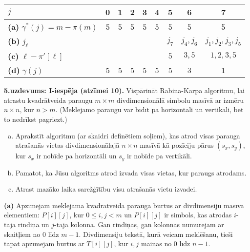 \documentclass[11pt]{article}
\begin{document}
\begin{tabular}{|l||c|c|c|c|c|c|c|c|} \hline
$j$ & 0 & 1 & 2 & 3 & 4 & 5 & 6 & 7 \\ \hline\hline
{\bf (a)} $\gamma^{\ast}(j) = m-\pi(m)$ & 5 & 5 & 5 & 5 & 5 & 5 & 5 & 5 \\ \hline
{\bf (b)} $j_\ell$ & & & & & & $j_7$ & $j_4,j_6$ & $j_1,j_2,j_3,j_5$ \\ \hline
{\bf (c)} $\ell - \pi'[\ell]$ &  &  &  & & & $5$ & $3,5$ & $1,2,3,5$ \\ \hline
{\bf (d)} $\gamma(j)$ & 5 & 5 & 5 & 5 & 5 & 5 & 3 & 1 \\ \hline
\end{tabular}




{\footnotesize
\vspace{10ex}
{\bf 5.uzdevums: I-iespēja (atzīmei 10).}
Vispārināt Rabina-Karpa algoritmu, lai atrastu kvadrātveida paraugu $m \times m$
divdimensionālā simbolu masīvā ar izmēru $n \times n$, kur $n > m$.
(Meklējamo paraugu var bīdīt pa horizontāli un vertikāli, bet to nedrīkst pagriezt.)
\begin{enumerate}[(a)]
\item
Aprakstīt algoritmu (ar skaidri definētiem soļiem),
kas atrod visas parauga atrašanās vietas divdimensionālajā
$n \times n$ masīvā kā pozīciju pārus $(s_x,s_y)$, kur $s_x$ ir nobīde pa horizontāli
un $s_y$ ir nobīde pa vertikāli.
\item
Pamatot, ka Jūsu algoritms atrod izvada visas vietas, kur paraugs atrodams.
\item
Atrast mazāko laika sarežģītību visu atrašanās vietu izvadei.
\end{enumerate}
}

\vspace{2ex}
{\bf (a)} Apzīmējam meklējamā kvadrātveida parauga burtus ar
divdimensiju masīva elementiem: $P[i][j]$, kur $0 \leq i,j < m$ un
$P[i][j]$ ir simbols, kas atrodas $i$-tajā rindiņā un $j$-tajā kolonnā.
Gan rindiņas, gan kolonnas numurējam ar skaitļiem no $0$ līdz $m-1$.
Divdimensiju tekstā, kurā veicam meklēšanu, tieši tāpat apzīmējam
burtus ar $T[i][j]$, kur $i,j$ mainās no $0$ līdz $n-1$.
\end{document}
